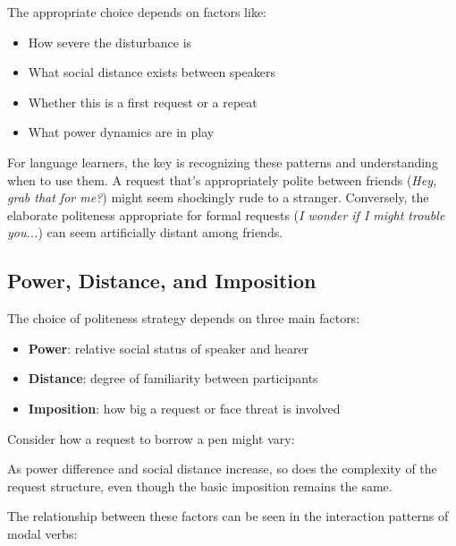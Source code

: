 The appropriate choice depends on factors like:
\begin{itemize}
    \item How severe the disturbance is
    \item What social distance exists between speakers
    \item Whether this is a first request or a repeat
    \item What power dynamics are in play
\end{itemize}

For language learners, the key is recognizing these patterns and understanding when to use them. A request that's appropriately polite between friends (\textit{Hey, grab that for me?}) might seem shockingly rude to a stranger. Conversely, the elaborate politeness appropriate for formal requests (\textit{I wonder if I might trouble you...}) can seem artificially distant among friends.

\subsection{Power, Distance, and Imposition}\label{sec:power}

The choice of politeness strategy depends on three main factors:
\begin{itemize}
    \item \textbf{Power}: relative social status of speaker and hearer
    \item \textbf{Distance}: degree of familiarity between participants
    \item \textbf{Imposition}: how big a request or face threat is involved
\end{itemize}

Consider how a request to borrow a pen might vary:
\ea \label{ex:pen-requests}
    \z
\z

As power difference and social distance increase, so does the complexity of the request structure, even though the basic imposition remains the same.

The relationship between these factors can be seen in the interaction patterns of modal verbs:
\ea \label{ex:modal-patterns}
    \z
\z

